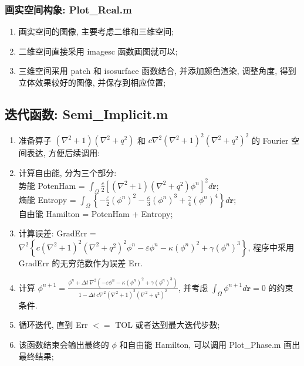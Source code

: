 \documentclass[12pt]{article}
\newcommand{\br}{\mathbf{r}}
\numberwithin{equation}{section}
\begin{document}
\begin{CJK}{UTF8}{gkai}
\subsubsection{画实空间构象: Plot\_Real.m}
\begin{enumerate}[(1).]
	\item 画实空间的图像, 主要考虑二维和三维空间;
	\item 二维空间直接采用 imagesc 函数画图就可以;
	\item 三维空间采用 patch 和 isosurface 函数结合, 并添加颜色渲染, 调整角度, 得到立体效果较好的图像, 并保存到相应位置;
\end{enumerate}


\subsection{迭代函数: Semi\_Implicit.m}

\begin{enumerate}[(1).]
	\item 准备算子 $ (\nabla^{2}+1) (\nabla^{2}+q^{2}) $ 和 $ c \nabla^{2} (\nabla^{2}+1)^{2} (\nabla^{2}+q^{2})^{2} $ 的 Fourier 空间表达, 方便后续调用:
	\item 计算自由能, 分为三个部分:\\
	势能 PotenHam = $ \int_{\Omega} \frac{c}{2} \left[ (\nabla^{2}+1) (\nabla^{2}+q^{2}) \phi^{n} \right]^{2} d\br $;\\
	熵能 Entropy = $ \int_{\Omega} \left\{ -\frac{\varepsilon}{2} (\phi^{n})^{2} - \frac{\kappa}{3} (\phi^{n})^{3} + \frac{\gamma}{4} (\phi^{n})^{4} \right\} d\br $;\\
	自由能 Hamilton = PotenHam + Entropy;
	\item 计算误差: GradErr = $ \nabla^{2} \left\{ c (\nabla^{2}+1)^{2} (\nabla^{2}+q^{2})^{2} \phi^{n} - \varepsilon \phi^{n} - \kappa (\phi^{n})^{2} + \gamma (\phi^{n})^{3} \right\} $, 程序中采用 GradErr 的无穷范数作为误差 Err.
	\item 计算 $ \phi^{n+1} = \frac{ \phi^{n} + \Delta t \, \nabla^{2} \left( -\varepsilon \phi^{n} - \kappa (\phi^{n})^{2} + \gamma (\phi^{n})^{3} \right) }{ 1 - \Delta t \, c \nabla^{2} (\nabla^{2}+1)^{2} (\nabla^{2}+q^{2})^{2} } $, 并考虑 $ \int_{\Omega} \phi^{n+1} d\br = 0 $ 的约束条件.
	\item 循环迭代, 直到 Err $<=$ TOL 或者达到最大迭代步数;
	\item 该函数结束会输出最终的 $ \phi $ 和自由能 Hamilton, 可以调用 Plot\_Phase.m 画出最终结果;
\end{enumerate}









\end{CJK}
\end{document}
